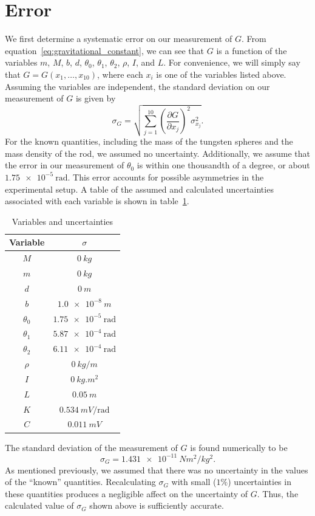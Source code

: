 \documentclass[aps, reprint,amsmath,amssymb]{revtex4-1} %
\renewcommand{\d}{\partial}
\begin{document}
\section{Error}
We first determine a systematic error on our measurement of $G$. From
equation~\eqref{eq:gravitational_constant}, we can see that $G$ is a
function of the variables $m$, $M$, $b$, $d$, $\theta_0$, $\theta_1$,
$\theta_2$, $\rho$, $I$, and $L$. For convenience, we will simply say that
$G = G(x_1,\ldots,x_{10})$, where each $x_i$ is one of the variables listed
above. Assuming the variables are independent, the standard deviation on our
measurement of $G$ is given by
\[
    \sigma_G = \sqrt{\sum_{j=1}^{10} \left( \frac{\d G}{\d x_j} \right)^2
    \sigma_{x_j}^2}.
\]
For the known quantities, including the mass of the tungsten spheres and
the mass density of the rod, we assumed no uncertainty. Additionally, we
assume that the error in our measurement of $\theta_0$ is within one
thousandth of a degree, or about $\SI{1.75e-5}{\radian}$. This error
accounts for possible asymmetries in the experimental setup. A table of the assumed and calculated uncertainties associated with each variable is shown in table~\ref{fig:errors}.
\begin{table}
\begin{tabular}{ |c|c| } 
 \hline
 Variable & $\sigma$ \\ \hline\hline
$M$ & $\SI{0}{kg}$ \\
$m$ & $\SI{0}{kg}$ \\
$d$ & $\SI{0}{m}$ \\
$b$ & $\SI{1.0e-8}{m}$ \\
$\theta_0$ & $\SI{1.75e-5}{\radian}$ \\
$\theta_1$ & $\SI{5.87e-4}{\radian}$ \\
$\theta_2$ & $\SI{6.11e-4}{\radian}$ \\
$\rho$ & $\SI{0}{kg/m}$ \\
$I$ & $\SI{0}{kg.m^2}$ \\
$L$ & $\SI{0.05}{m}$ \\ 
$K$ & $\SI{0.534}{mV/\radian}$ \\
$C$ & $\SI{0.011}{mV}$ \\ \hline
\end{tabular}
\caption{Variables and uncertainties}
\label{fig:errors}
\end{table}
The standard deviation of the measurement of $G$ is found numerically to be
\[
    \sigma_G = \SI{1.431e-11}{Nm^2/kg^2}.
\]
As mentioned previously, we assumed that there was no uncertainty in the
values of the ``known'' quantities. Recalculating $\sigma_G$ with small
($1\%$) uncertainties in these quantities produces a negligible affect on
the uncertainty of $G$. Thus, the calculated value of $\sigma_G$ shown
above is sufficiently accurate.
\end{document}
